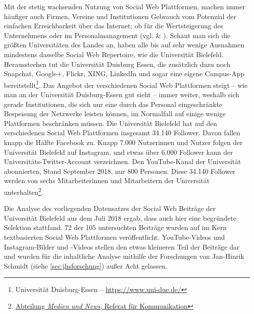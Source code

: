 Mit der stetig wachsenden Nutzung von Social Web Plattformen, machen immer häufiger auch Firmen, Vereine und Institutionen Gebrauch vom Potenzial der einfachen Erreichbarkeit über das Internet; ob für die Wertsteigerung des Unternehmens oder im Personalmanagement (vgl. \cite{culnan2010large} \& \cite{barmann2016social}). Schaut man sich die größten Universitäten des Landes an, haben alle bis auf sehr wenige Ausnahmen mindestens dasselbe Social Web Repertoire, wie die Universität Bielefeld. Herausstechen tut die Universität Duisburg Essen, die zusätzlich dazu noch Snapchat, Google+, Flickr, XING, LinkedIn und sogar eine eigene Campus-App bereitstellt\footnote{Universität Duisburg-Essen -- \url{https://www.uni-due.de/}}. Das Angebot der verschiedenen Social Web Plattformen steigt -- wie man an der Universität Duisburg-Essen gut sieht -- immer weiter, weshalb sich gerade Institutionen, die sich nur eine durch das Personal eingeschränkte Bespeisung der Netzwerke leisten können, im Normalfall auf einige wenige Plattformen beschränken müssen. Die Universität Bielefeld hat auf den verschiedenen Social Web Plattformen insgesamt 34.140 Follower. Davon fallen knapp die Hälfte Facebook zu. Knapp 7.000 Nutzerinnen und Nutzer folgen der Universität Bielefeld auf Instagram, und etwas über 6.000 Follower kann der Universitäts-Twitter-Account verzeichnen. Den YouTube-Kanal der Universität abonnierten, Stand September 2018, nur 800 Personen. Diese 34.140 Follower werden von sechs Mitarbeiterinnen und Mitarbeitern der Universität unterhalten\footnote{\href{https://ekvv.uni-bielefeld.de/pers_publ/publ/EinrichtungDetail.jsp?orgId=7116054}{Abteilung \textit{Medien und News}, Referat für Kommunikation}}.

Die Analyse des vorliegenden Datensatzes der Social Web Beiträge der Universität Bielefeld aus dem Juli 2018 ergab, dass auch hier eine begründete Selektion stattfand. 72 der 105 untersuchten Beiträge wurden auf im Kern textbasierten Social Web Plattformen veröffentlicht. YouTube-Videos und Instagram-Bilder und -Videos stellen den etwas kleineren Teil der Beiträge dar und wurden für die inhaltliche Analyse mithilfe der Forschungen von Jan-Hinrik Schmidt (siehe \ref{sec:jhsforschung}) außer Acht gelassen.


